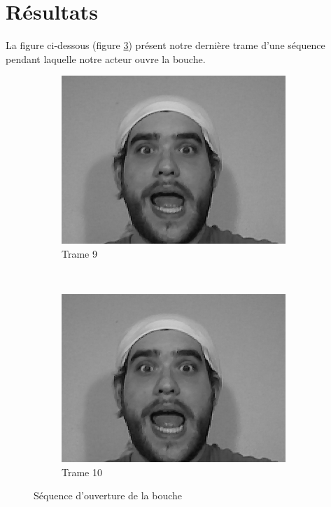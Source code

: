 \documentclass[a4paper,12pt]{article}
\begin{document}
\newpage
\section{Résultats}

La figure ci-dessous (figure \ref{fig:trames910}) présent notre
dernière trame d'une séquence pendant laquelle notre acteur ouvre la bouche. 

\begin{figure}[ht!]
        \centering
        \begin{subfigure}[b]{0.5\textwidth}
                \centering
                \includegraphics[width=\textwidth]{img/f9}
                \caption{Trame 9}
                \label{fig:trame9}
        \end{subfigure}%
        ~ %
        \begin{subfigure}[b]{0.5\textwidth}
                \centering
                \includegraphics[width=\textwidth]{img/f10}
                \caption{Trame 10}
                \label{fig:trame10}
        \end{subfigure}
        \caption{Séquence d'ouverture de la bouche}
        \label{fig:trames910}
\end{figure}
\end{document}
